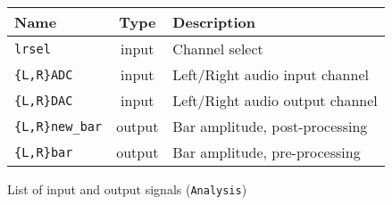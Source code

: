 \begin{figure}[h]
  \centering
  \caption{List of input and output signals (\texttt{Analysis})}
  \begin{tabular}{|l|c|l|}
    \hline
    Name & Type & Description \\    \hline
    \texttt{lrsel} & input & Channel select \\    \hline
    \texttt{\{L,R\}ADC} & input & Left/Right audio input channel \\    \hline
    \texttt{\{L,R\}DAC} & input & Left/Right audio output channel \\    \hline
    \texttt{\{L,R\}new\_bar} & output & Bar amplitude, post-processing\\    \hline
    \texttt{\{L,R\}bar} & output & Bar amplitude, pre-processing\\    \hline
  \end{tabular}
  \label{tab:analsig}
\end{figure}
